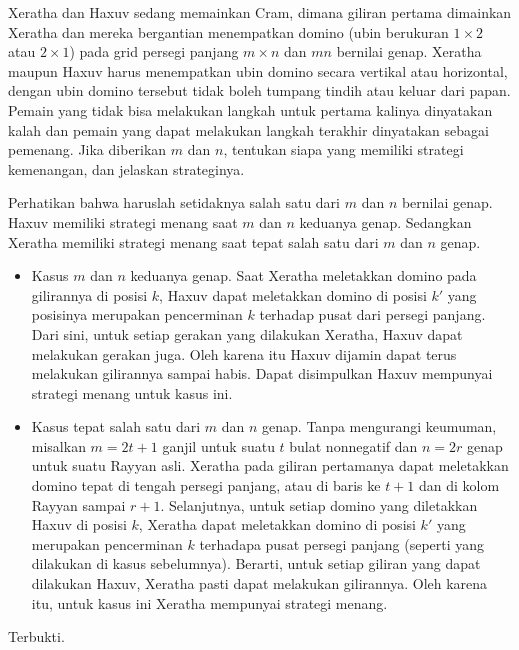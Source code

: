 \documentclass[11pt]{scrartcl}
\begin{document}
\begin{soaljawab}
Xeratha dan Haxuv sedang memainkan Cram, dimana giliran pertama dimainkan Xeratha dan mereka bergantian menempatkan domino (ubin berukuran $1 \times 2$ atau $2 \times 1$) pada grid persegi panjang $m \times n$ dan $mn$ bernilai genap. Xeratha maupun Haxuv harus menempatkan ubin domino secara vertikal atau horizontal, dengan ubin domino tersebut tidak boleh tumpang tindih atau keluar dari papan. Pemain yang tidak bisa melakukan langkah untuk pertama kalinya dinyatakan kalah dan pemain yang dapat melakukan langkah terakhir dinyatakan sebagai pemenang. Jika diberikan $m$ dan $n$, tentukan siapa yang memiliki strategi kemenangan, dan jelaskan strateginya.
    \begin{solusi}
        Perhatikan bahwa haruslah setidaknya salah satu dari $m$ dan $n$ bernilai genap. Haxuv memiliki strategi menang saat $m$ dan $n$ keduanya genap. Sedangkan Xeratha memiliki strategi menang saat tepat salah satu dari $m$ dan $n$ genap.
        \begin{itemize}
            \item Kasus $m$ dan $n$ keduanya genap. Saat Xeratha meletakkan domino pada gilirannya di posisi $k$, Haxuv dapat meletakkan domino di posisi $k'$ yang posisinya merupakan pencerminan $k$ terhadap pusat dari persegi panjang. Dari sini, untuk setiap gerakan yang dilakukan Xeratha, Haxuv dapat melakukan gerakan juga. Oleh karena itu Haxuv dijamin dapat terus melakukan gilirannya sampai habis. Dapat disimpulkan Haxuv mempunyai strategi menang untuk kasus ini.
            \item Kasus tepat salah satu dari $m$ dan $n$ genap. Tanpa mengurangi keumuman, misalkan $m=2t+1$ ganjil untuk suatu $t$ bulat nonnegatif dan $n=2r$ genap untuk suatu Rayyan asli. Xeratha pada giliran pertamanya dapat meletakkan domino tepat di tengah persegi panjang, atau di baris ke $t+1$ dan di kolom Rayyan sampai $r+1$. Selanjutnya, untuk setiap domino yang diletakkan Haxuv di posisi $k$, Xeratha dapat meletakkan domino di posisi $k'$ yang merupakan pencerminan $k$ terhadapa pusat persegi panjang (seperti yang dilakukan di kasus sebelumnya). Berarti, untuk setiap giliran yang dapat dilakukan Haxuv, Xeratha pasti dapat melakukan gilirannya. Oleh karena itu, untuk kasus ini Xeratha mempunyai strategi menang.
        \end{itemize}
        Terbukti.
    \end{solusi}
\end{soaljawab}
\end{document}
